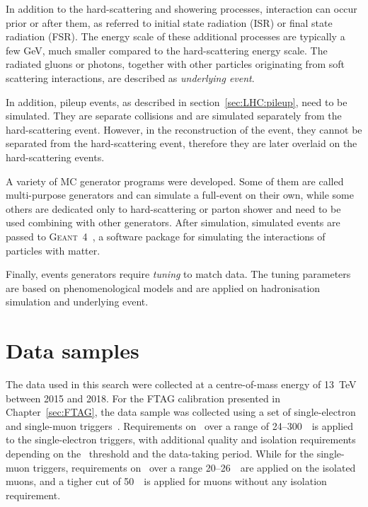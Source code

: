 In addition to the hard-scattering and showering processes,
interaction can occur prior or after them, as referred to 
initial state radiation (ISR) or final state radiation (FSR).
The energy scale of these additional processes are typically a
few GeV, much smaller compared to the hard-scattering energy scale.
The radiated gluons or photons, together with other particles originating from
soft scattering interactions, are described as \textit{underlying event}.

In addition, pileup events, as described in section~\ref{sec:LHC:pileup},
need to be simulated. 
They are separate collisions and are simulated 
separately from the hard-scattering
event. However, in the reconstruction of the event, 
they cannot be separated from the hard-scattering
event, therefore they are later overlaid on the hard-scattering
events.

A variety of MC generator programs were developed. 
Some of them are called multi-purpose generators and can
simulate a full-event on their own,
while some others are dedicated only to hard-scattering or
parton shower and need to be used combining with other generators. 
After simulation, 
simulated events are passed to \textsc{Geant~4}~\cite{Geant4,SOFT-2010-01}, 
a software package for simulating the interactions of particles with matter. 

Finally, events generators require \textit{tuning} to match data. 
The tuning parameters are based on phenomenological models and are
applied on hadronisation simulation and underlying event. 

\section{Data samples}
\label{sec:DiHiggs:data}

The data used in this search were collected at a 
centre-of-mass energy
of 13~TeV between 2015 and 2018.
For the FTAG calibration presented in Chapter~\ref{sec:FTAG}, 
the data sample was collected using a set of 
single-electron~\cite{TRIG-2018-05} and single-muon triggers~\cite{Aad:2020uyd}. 
Requirements on \pt\ over a range of 24--300~\GeV\ is applied 
to the single-electron triggers, with additional quality and 
isolation requirements depending on the \pt\ threshold and the 
data-taking period.
While for the single-muon triggers,
requirements on \pt\ over a range 20--26~\GeV\ are applied on the 
isolated muons, and a tigher cut of 50~\GeV\ is applied for muons 
without any isolation requirement. 


